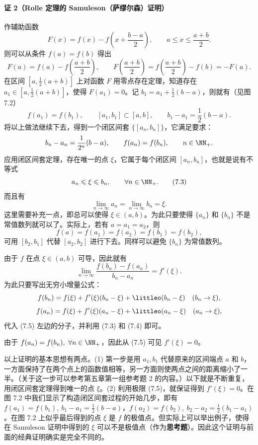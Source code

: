 \paragraph{证 2（Rolle 定理的 Samuleson（萨缪尔森）证明）}
作辅助函数
\[
  F(x)=f(x)-f\left(x+\frac{b-a}{2}\right),\qquad a\leqslant x\leqslant\frac{a+b}{2}.
\]
则可以从条件 $f(a)=f(b)$ 得出
\[
  F(a)=f(a)-f\left(\frac{a+b}{2}\right),\qquad
  F\left(\frac{a+b}{2}\right)=f\left(\frac{a+b}{2}\right)-f(b)=-F(a).
\]
在区间 $\left[a,\frac12(a+b)\right]$ 上对函数 $F$ 用零点存在定理，知道存在 $a_1\in\left[a,\frac12(a+b)\right]$，使得 $F(a_1)=0$。记 $b_1=a_1+\frac12(b-a)$，则就有（见图 7.2）
\[
  f(a_1)=f(b_1),\qquad [a_1,b_1]\subset[a,b],\qquad b_1-a_1=\frac12(b-a).
\]
将以上做法继续下去，得到一个闭区间套 $\{[a_n,b_n]\}$，它满足要求：
\[
  b_n-a_n=\frac{1}{2^n}(b-a),\qquad f(a_n)=f(b_n),\qquad n\in\NN_+.
\]
应用闭区间套定理，存在唯一的点 $\xi$，它属于每个闭区间 $[a_n,b_n]$，也就是说有不等式
\begin{equation}
  a_n\leqslant\xi\leqslant b_n,\qquad \forall n\in\NN_+.
  \tag{7.3}
\end{equation}
而且有
\begin{equation}
  \lim_{n\to\infty}a_n=\lim_{n\to\infty}b_n=\xi.
  \tag{7.4}
\end{equation}
这里需要补充一点，即总可以使得 $\xi\in(a,b)$。为此只要使得 $\{a_n\}$ 和 $\{b_n\}$ 不是常值数列就可以了。实际上，若有 $a=a_1=a_2$，则
\[
  f(a)=f(a_1)=f(a_2)=f(b_1)=f(b_2),
\]
可用 $[b_2,b_1]$ 代替 $[a_2,b_2]$ 进行下去。同样可以避免 $\{b_n\}$ 为常值数列。

由于 $f$ 在点 $\xi\in(a,b)$ 可导，因此就有
\begin{equation}
  \lim_{n\to\infty}\frac{f(b_n)-f(a_n)}{b_n-a_n}=f'(\xi).
  \tag{7.5}
\end{equation}
为此只要写出无穷小增量公式：
\[
  f(b_n)=f(\xi)+f'(\xi)(b_n-\xi)+\littleo(b_n-\xi)\quad(b_n\to\xi),
\]
\[
  f(a_n)=f(\xi)+f'(\xi)(a_n-\xi)+\littleo(a_n-\xi)\quad(a_n\to\xi),
\]
代入 (7.5) 左边的分子，并利用 (7.3) 和 (7.4) 即可。

由于 $f(a_n)=f(b_n),\ \forall n\in\NN_+$，因此从 (7.5) 可见 $f'(\xi)=0$。

\begin{xremark}
以上证明的基本思想有两点。(1) 第一步是用 $a_1,b_1$ 代替原来的区间端点 $a$ 和 $b$，一方面保持了在两个点上的函数值相等，另一方面则使两点之间的距离缩小了一半。（关于这一步可以参考第五章第一组参考题 2 的内容。）以下就是不断重复，用闭区间套定理得到唯一的点 $\xi$。(2) 利用极限 (7.5)，就保证得到 $f'(\xi)=0$。在图 7.2 中我们显示了构造闭区间套过程的开始几步，即有 $f(a_1)=f(b_1),\ b_1-a_1=\frac12(b-a)$，$f(a_2)=f(b_2),\ b_2-a_2=\frac12(b_1-a_1)$。在图 7.2 上似乎最后得到的点 $\xi$ 是 $f$ 的极值点。但实际上可以举出例子，使得在 Samuleson 证明中得到的 $\xi$ 可以不是极值点（作为\textbf{思考题}）。因此这个证明与前面的经典证明确实是完全不同的。
\end{xremark}

